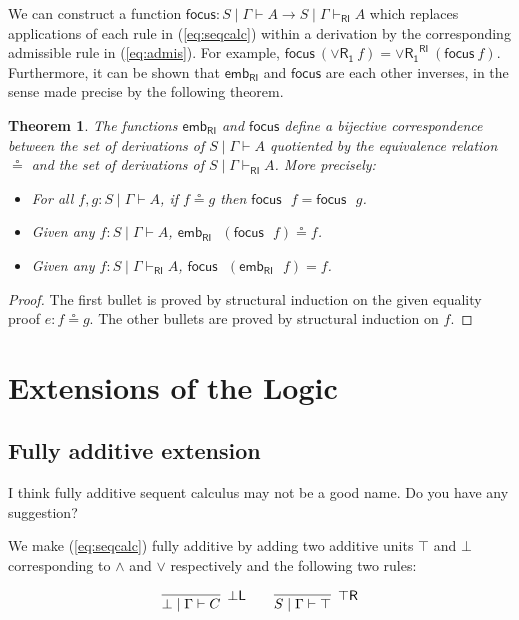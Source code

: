 \documentclass[submission,copyright,creativecommons]{eptcs}
\newtheorem{theorem}{Theorem}[section]
\theoremstyle{definition}
\newcommand{\orrone}{\lor \mathsf{R_{1}}}
\newcommand{\RI}{\mathsf{RI}}
\newcommand{\topr}{\top \mathsf{R}}
\newcommand{\botl}{\bot \mathsf{L}}
\newcommand\cheng[1]{\mbox{}
{\marginpar{\color{blue}CSW}}
{\sf\noindent\color{blue}#1}}%
\begin{document}
We can construct a function $\mathsf{focus} : S \mid \Gamma \vdash A \to S \mid \Gamma \vdash_{\RI} A$ which replaces applications of each rule in (\ref{eq:seqcalc}) within a derivation by the corresponding admissible rule in (\ref{eq:admis}).
For example, $\mathsf{focus} \ (\orrone \ f) = \orrone^{\RI} \ (\mathsf{focus} \ f)$. Furthermore, it can be shown that $\mathsf{emb}_{\RI}$ and $\mathsf{focus}$ are each other inverses, in the sense made precise by the following theorem.
\begin{theorem}
  The functions $\mathsf{emb}_{\RI}$ and $\mathsf{focus}$ define a bijective correspondence between the set of derivations of $S \mid \Gamma \vdash A$ quotiented by the equivalence relation $\circeq$ and the set of derivations of $S \mid \Gamma \vdash_{\RI} A$. More precisely:
  \begin{itemize}
    \item For all $f, g : S \mid \Gamma \vdash A$, if $f \circeq g$ then $\mathsf{focus} \text{ } f = \mathsf{focus} \text{ } g$.
    \item Given any $f : S \mid \Gamma \vdash A$, $\mathsf{emb}_{\RI} \text{ } (\mathsf{focus} \text{ } f) \circeq f$.
    \item Given any $f : S \mid \Gamma \vdash_{\RI} A$, $\mathsf{focus} \text{ } (\mathsf{emb}_{\RI} \text{ } f) = f$.
  \end{itemize}
\end{theorem}
\begin{proof}
  The first bullet is proved by structural induction on the given equality proof $e : f \circeq g$. The other bullets are proved by structural induction on $f$.
\end{proof}

\section{Extensions of the Logic}\label{sec:extensions}
\subsection{Fully additive extension}\label{subsec:AddUnits}
\cheng{I think fully additive sequent calculus may not be a good name. Do you have any suggestion?}

We make (\ref{eq:seqcalc}) fully additive by adding two additive units $\top$ and $\bot$ corresponding to $\land$ and $\lor$ respectively and the following two rules:

\begin{displaymath}
  \begin{array}{c}
    \infer[\botl]{\bot \mid \Gamma \vdash C}{}
    \qquad
    \infer[\topr]{S \mid \Gamma \vdash \top}{}
  \end{array}
\end{displaymath}
\end{document}
